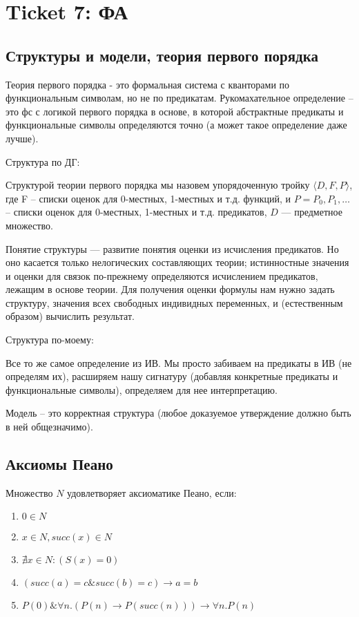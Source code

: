 \section{Ticket 7: ФА}
\label{sec-9}
\subsection{Структуры и модели, теория первого порядка}
\label{sec-9-1}
Теория первого порядка - это формальная система с кванторами по
функциональным символам, но не по предикатам. Рукомахательное
определение – это фс с логикой первого порядка в основе, в которой
абстрактные предикаты и функциональные символы определяются точно
(а может такое определение даже лучше).

Структура по ДГ:

Структурой теории первого порядка мы назовем упорядоченную тройку
$\langle D, F, P\rangle$, где F -- списки оценок для 0-местных, 1-местных и т.д.
функций, и $P = P_0, P_1,\dotsc$ -- списки оценок для 0-местных,
1-местных и т.д. предикатов, $D$ — предметное множество.

Понятие структуры — развитие понятия оценки из исчисления предикатов.
Но оно касается только нелогических составляющих теории; истинностные
значения и оценки для связок по-прежнему определяются исчислением
предикатов, лежащим в основе теории. Для получения оценки формулы
нам нужно задать структуру, значения всех свободных индивидных
переменных, и (естественным образом) вычислить результат.

Структура по-моему:

Все то же самое определение из ИВ. Мы просто забиваем на предикаты
в ИВ (не определям их), расширяем нашу сигнатуру (добавляя конкретные
предикаты и функциональные символы), определяем для нее интерпретацию.

Модель -- это корректная структура (любое доказуемое утверждение должно
быть в ней общезначимо).
\subsection{Аксиомы Пеано}
\label{sec-9-2}
Множество $N$ удовлетворяет аксиоматике Пеано, если:
\begin{enumerate}
\item $0 \in N$
\item $x \in N, succ(x) \in N$
\item $\nexists x \in N : (S(x) = 0)$
\item $(succ(a) = c \& succ(b) = c) \to a = b$
\item $P(0) \& \forall n.(P(n) \to P(succ(n))) \to \forall n.P(n)$
\end{enumerate}
